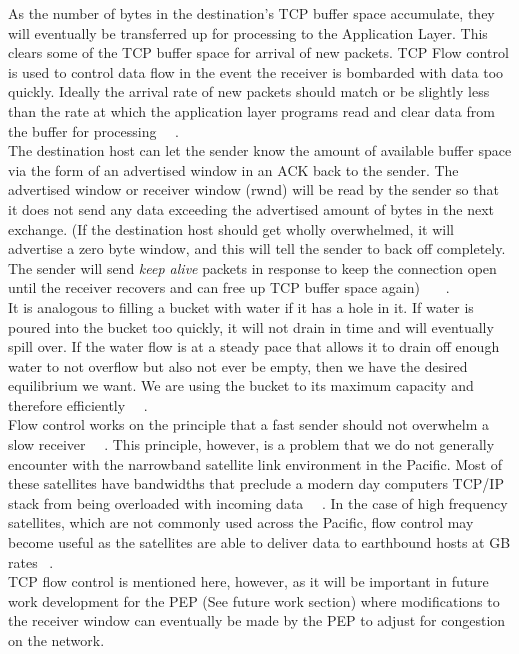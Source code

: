 As the number of bytes in the destination's TCP buffer space accumulate, they will eventually be transferred up for processing to the Application Layer. This clears some of the TCP buffer space for arrival of new packets. TCP Flow control is used to control data flow in the event the receiver is bombarded with data too quickly. Ideally the arrival rate of new packets should match or be slightly less than the rate at which the application layer programs read and clear data from the buffer for processing ~\cite{2}~\cite{19}.\\

The destination host can let the sender know the amount of available buffer space via the form of an advertised window in an ACK back to the sender. The advertised window or receiver window (rwnd) will be read by the sender so that it does not send any data exceeding the advertised amount of bytes in the next exchange. (If the destination host should get wholly overwhelmed, it will advertise a zero byte window, and this will tell the sender to back off completely. The sender will send \emph{keep alive} packets in response to keep the connection open until the receiver recovers and can free up TCP buffer space again) ~\cite{1}~\cite{2}~\cite{19}. \\

It is analogous to filling a bucket with water if it has a hole in it. If water is poured into the bucket too quickly, it will not drain in time and will eventually spill over. If the water flow is at a steady pace that allows it to drain off enough water to not overflow but also not ever be empty, then we have the desired equilibrium we want. We are using the bucket to its maximum capacity and therefore efficiently ~\cite{1}~\cite{2}\cite{19}. \\

Flow control works on the principle that a fast sender should not overwhelm a slow receiver ~\cite{1}~\cite{19}. This principle, however, is a problem that we do not generally encounter with the narrowband satellite link environment in the Pacific. Most of these satellites have bandwidths that preclude a modern day computers TCP/IP stack from being overloaded with incoming data ~\cite{4}~\cite{5}. In the case of high frequency satellites, which are not commonly used across the Pacific, flow control may become useful as the satellites are able to deliver data to earthbound hosts at GB rates ~\cite{5}. \\

TCP flow control is mentioned here, however, as it will be important in future work development for the PEP (See future work section) where modifications to the receiver window can eventually be made by the PEP to adjust for congestion on the network.

